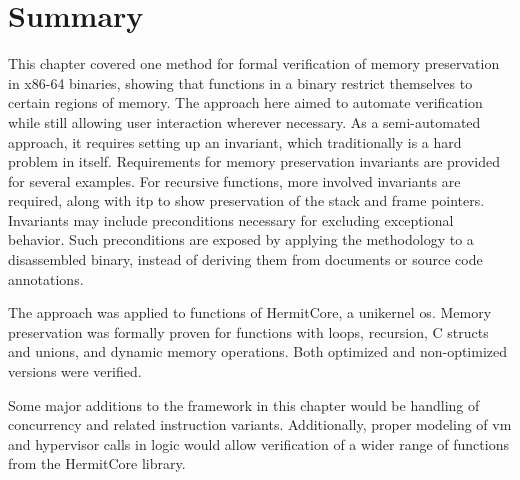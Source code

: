 \section{Summary}
This chapter covered one method for formal verification%
of memory preservation in x86-64 binaries,%
showing that functions in a binary restrict themselves to certain regions of memory.
The approach here aimed to automate verification
while still allowing user interaction wherever necessary.
As a semi-automated approach,
it requires setting up an invariant, which traditionally is a hard problem in itself.
Requirements for memory preservation invariants are provided for several examples.
For recursive functions, more involved invariants are required,
along with \ac{itp} to show preservation of the stack and frame pointers.
Invariants may include preconditions necessary for excluding exceptional behavior.
Such preconditions are exposed by applying the methodology to a disassembled binary,
instead of deriving them from documents or source code annotations.

The approach was applied to functions of HermitCore, a unikernel \ac{os}.%
%
Memory preservation was formally proven for functions with loops, recursion,
C structs and unions, and dynamic memory operations.
Both optimized and non-optimized versions were verified.

Some major additions to the framework in this chapter
would be handling of concurrency and related instruction variants.
Additionally, proper modeling of \ac{vm} and hypervisor calls in logic%
would allow verification of a wider range of functions from the HermitCore library.%

